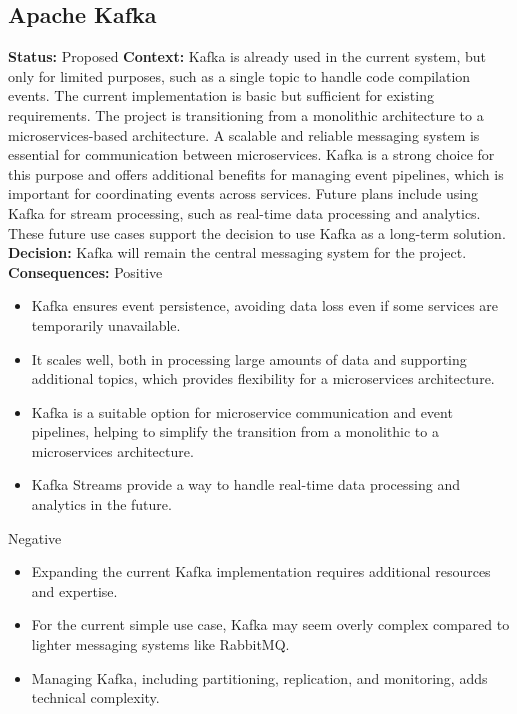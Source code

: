 \subsection{Apache Kafka}
\textbf{Status:} Proposed
\newline
\newline
\textbf{Context:}
Kafka is already used in the current system, but only for limited purposes, such as a single topic to handle code compilation events. The current implementation is basic but sufficient for existing requirements.
The project is transitioning from a monolithic architecture to a microservices-based architecture. A scalable and reliable messaging system is essential for communication between microservices. Kafka is a strong choice for this purpose and offers additional benefits for managing event pipelines, which is important for coordinating events across services.
Future plans include using Kafka for stream processing, such as real-time data processing and analytics. These future use cases support the decision to use Kafka as a long-term solution.
\newline
\newline
\textbf{Decision:}
Kafka will remain the central messaging system for the project.
\newline
\newline
\textbf{Consequences:}
\newline
\newline
Positive
\begin{itemize}
    \item Kafka ensures event persistence, avoiding data loss even if some services are temporarily unavailable.
    \item It scales well, both in processing large amounts of data and supporting additional topics, which provides flexibility for a microservices architecture.
    \item Kafka is a suitable option for microservice communication and event pipelines, helping to simplify the transition from a monolithic to a microservices architecture.
    \item Kafka Streams provide a way to handle real-time data processing and analytics in the future.
\end{itemize}
Negative
\begin{itemize}
    \item Expanding the current Kafka implementation requires additional resources and expertise.
    \item For the current simple use case, Kafka may seem overly complex compared to lighter messaging systems like RabbitMQ.
    \item Managing Kafka, including partitioning, replication, and monitoring, adds technical complexity.
\end{itemize}



